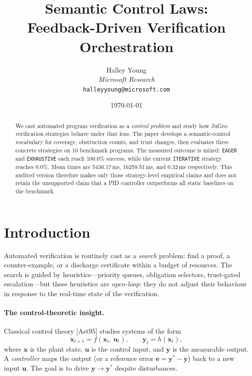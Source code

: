 \documentclass[11pt]{article}
\title{Semantic Control Laws:\\
       Feedback-Driven Verification Orchestration}
\author{%
  Halley Young\\
  \textit{Microsoft Research}\\
  \texttt{halleyyoung@microsoft.com}
}
\date{\today}
\newcommand{\xstate}{\mathbf{x}}           %
\newcommand{\uctrl}{\mathbf{u}}            %
\newcommand{\yout}{\mathbf{y}}             %
\newcommand{\estate}{\mathbf{e}}           %
\newcommand{\citeAst}{[Ast95]}
\begin{document}
\maketitle

\begin{abstract}
We cast automated program verification as a \emph{control problem} and
study how JuGeo verification strategies behave under that lens.  The
paper develops a semantic-control vocabulary for coverage, obstruction
counts, and trust changes, then evaluates three concrete strategies on
10 benchmark programs.  The measured outcome is mixed: \texttt{EAGER}
and \texttt{EXHAUSTIVE} each reach 100.0\% success, while the current
\texttt{ITERATIVE} strategy reaches 0.0\%.  Mean times are
5436.17\,ms, 16259.51\,ms, and 0.32\,ms respectively.  This audited
version therefore makes only those strategy-level empirical claims and
does not retain the unsupported claim that a PID controller outperforms
all static baselines on the benchmark.
\end{abstract}


\section{Introduction}
\label{sec:intro}

Automated verification is routinely cast as a \emph{search} problem:
find a proof, a counter-example, or a discharge certificate within a
budget of resources.  The search is guided by heuristics---priority
queues, obligation selectors, trust-gated escalation---but these
heuristics are \emph{open-loop}: they do not adjust their behaviour in
response to the real-time state of the verification.

\paragraph{The control-theoretic insight.}
Classical control theory \citeAst{} studies systems of the form
\[
  \xstate_{t+1} = f(\xstate_t,\, \uctrl_t),\qquad
  \yout_t = h(\xstate_t),
\]
where $\xstate$ is the plant state, $\uctrl$ is the control input, and
$\yout$ is the measurable output.  A \emph{controller} maps the output
(or a reference error $\estate = \yout^* - \yout$) back to a new input
$\uctrl$.  The goal is to drive $\yout \to \yout^*$ despite disturbances.
\end{document}
